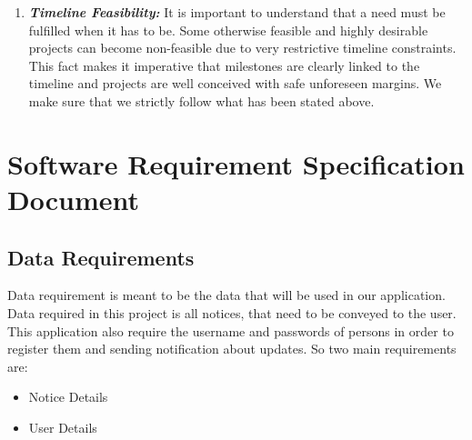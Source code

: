 \begin{enumerate}
\item \textbf{\emph{Timeline Feasibility:}} It is important to understand that a need must be fulfilled when it has to be. Some otherwise feasible and highly desirable projects can become non-feasible due to very restrictive timeline constraints. This fact makes it imperative that milestones are clearly linked to the timeline and projects are well conceived with safe unforeseen margins. We make sure that we strictly follow what has been stated above.

\end{enumerate}

\pagebreak

\section{Software Requirement Specification Document}

\subsection{Data Requirements}
Data requirement is meant to be the data that will be used in our application. Data required in this project is all notices, that need to be conveyed to the user. This application also require the username and passwords of persons in order to register them and sending notification about updates. So two main requirements are:
\begin{itemize}
\item {Notice Details}
\item {User Details}
\end{itemize}

